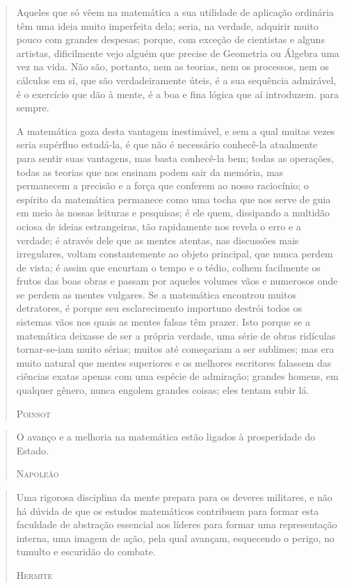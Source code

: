 \documentclass{hipatia}
\begin{document}
\begin{quote}
Aqueles que só vêem na matemática a sua utilidade de aplicação ordinária têm uma ideia muito imperfeita dela; seria, na verdade, adquirir muito pouco com grandes despesas; porque, com exceção de cientistas e alguns artistas, dificilmente vejo alguém que precise de Geometria ou Álgebra uma vez na vida. Não são, portanto, nem as teorias, nem os processos, nem os cálculos em si, que são verdadeiramente úteis, é a sua sequência admirável, é o exercício que dão à mente, é a boa e fina lógica que aí introduzem. para sempre.

A matemática goza desta vantagem inestimável, e sem a qual muitas vezes seria supérfluo estudá-la, é que não é necessário conhecê-la atualmente para sentir suas vantagens, mas basta conhecê-la bem; todas as operações, todas as teorias que nos ensinam podem sair da memória, mas permanecem a precisão e a força que conferem ao nosso raciocínio; o espírito da matemática permanece como uma tocha que nos serve de guia em meio às nossas leituras e pesquisas; é ele quem, dissipando a multidão ociosa de ideias estrangeiras, tão rapidamente nos revela o erro e a verdade; é através dele que as mentes atentas, nas discussões mais irregulares, voltam constantemente ao objeto principal, que nunca perdem de vista; é assim que encurtam o tempo e o tédio, colhem facilmente os frutos das boas obras e passam por aqueles volumes vãos e numerosos onde se perdem as mentes vulgares. Se a matemática encontrou muitos detratores, é porque seu esclarecimento importuno destrói todos os sistemas vãos nos quais as mentes falsas têm prazer. Isto porque se a matemática deixasse de ser a própria verdade, uma série de obras ridículas tornar-se-iam muito sérias; muitos até começariam a ser sublimes; mas era muito natural que mentes superiores e os melhores escritores falassem das ciências exatas apenas com uma espécie de admiração; grandes homens, em qualquer gênero, nunca engolem grandes coisas; eles tentam subir lá.

\hfill \textsc{Poinsot}
\end{quote}

\begin{quote}
O avanço e a melhoria na matemática estão ligados à prosperidade do Estado.

\hfill \textsc{Napoleão}
\end{quote}

\begin{quote}
Uma rigorosa disciplina da mente prepara para os deveres militares, e não há dúvida de que os estudos matemáticos contribuem para formar esta faculdade de abstração essencial aos líderes para formar uma representação interna, uma imagem de ação, pela qual avançam, esquecendo o perigo, no tumulto e escuridão do combate.

\hfill \textsc{Hermite}
\end{quote}
 
\end{document}
